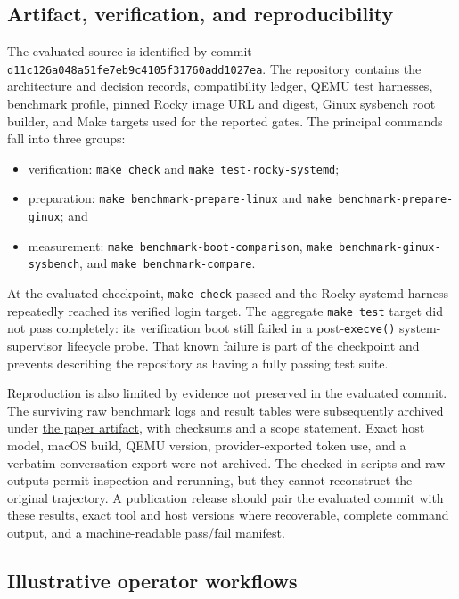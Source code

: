 \documentclass[11pt]{article}
\newcommand{\evaluatedcommit}{\texttt{d11c126a048a\allowbreak{}51fe7eb9c410\allowbreak{}5f31760add10\allowbreak{}27ea}}
\begin{document}
\subsection{Artifact, verification, and reproducibility}

The evaluated source is identified by commit \evaluatedcommit{}. The repository
contains the architecture and decision records, compatibility ledger, QEMU test
harnesses, benchmark profile, pinned Rocky image URL and digest, Ginux sysbench
root builder, and Make targets used for the reported gates. The principal
commands fall into three groups:

\begin{itemize}[leftmargin=*,topsep=0.3em,itemsep=0.15em,parsep=0pt]
\item verification: \texttt{make check} and \texttt{make test-rocky-systemd};
\item preparation: \texttt{make benchmark-prepare-linux} and
  \texttt{make benchmark-prepare-ginux}; and
\item measurement: \texttt{make benchmark-boot-comparison},
  \texttt{make benchmark-ginux-sysbench}, and \texttt{make benchmark-compare}.
\end{itemize}

At the evaluated checkpoint, \texttt{make check} passed and the Rocky systemd
harness repeatedly reached its verified login target. The aggregate
\texttt{make test} target did not pass completely: its verification boot still
failed in a post-\texttt{execve()} system-supervisor lifecycle probe. That known
failure is part of the checkpoint and prevents describing the repository as
having a fully passing test suite.

Reproduction is also limited by evidence not preserved in the evaluated
commit. The surviving raw benchmark logs and result tables were subsequently
archived under
\href{https://github.com/gmkurtzer/ginux/tree/main/docs/paper/artifact/benchmark-2026-10-23}{the paper artifact},
with checksums and a scope statement. Exact host model, macOS build, QEMU
version, provider-exported token use, and a verbatim conversation export were
not archived. The checked-in scripts and raw outputs permit inspection and
rerunning, but they cannot reconstruct the original trajectory. A publication
release should pair the evaluated commit with these results, exact tool and
host versions where recoverable, complete command output, and a
machine-readable pass/fail manifest.

\subsection{Illustrative operator workflows}
\end{document}
